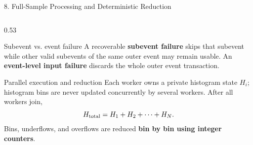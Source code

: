 \documentclass{beamer}
\begin{document}
\begin{frame}{8. Full-Sample Processing and Deterministic Reduction}
\begin{columns}[T]
\begin{column}{0.53\textwidth}
\vspace{-0.2em}
\begin{block}{Subevent vs. event failure}
A recoverable \textbf{subevent failure} skips that subevent while other valid subevents of the same outer event may remain usable. An \textbf{event-level input failure} discards the whole outer event transaction.
\end{block}

\vspace{-0.2em}
\begin{block}{Parallel execution and reduction}
Each worker owns a private histogram state $H_i$; histogram bins are never updated concurrently by several workers. After all workers join,
\[
H_{\rm total}=H_1+H_2+\cdots+H_N.
\]
Bins, underflows, and overflows are reduced \textbf{bin by bin using integer counters}.
\end{block}
\end{column}

\end{columns}

\vfill
\begin{center}
\end{center}

\end{frame}
\end{document}
